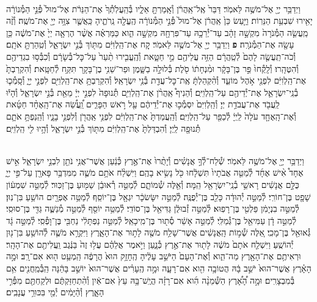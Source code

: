 \documentclass[twoside, openany, parskip=half, 11pt]{book}
\begin{document}
\begin{footnotesize}
\begin{multicols}{2}
\\
וַיְדַבֵּ֥ר יְיָ֖ אֶל־מֹשֶׁ֥ה לֵּאמֹֽר׃ דַּבֵּר֙ אֶֽל־אַֽהֲרֹ֔ן וְ֯אָֽמַרְתָּ֖ אֵלָ֑יו בְּ֯הַֽעֲלֹֽתְ֯ךָ֙ אֶת־הַנֵּרֹ֔ת אֶל־מוּל֙ פְּ֯נֵ֣י הַמְּ֯נוֹרָ֔ה יָאִ֖ירוּ שִׁבְעַ֥ת הַנֵּרֽוֹת׃ וַיַּ֤עַשׂ כֵּן֙ אַֽהֲרֹ֔ן אֶל־מוּל֙ פְּ֯נֵ֣י הַמְּ֯נוֹרָ֔ה הֶֽעֱלָ֖ה נֵֽרֹתֶ֑יהָ כַּֽאֲשֶׁ֛ר צִוָּ֥ה יְיָ֖ אֶת־מֹשֶֽׁה׃ וְ֯זֶ֨ה מַֽעֲשֵׂ֤ה הַמְּ֯נֹרָה֙ מִקְשָׁ֣ה זָהָ֔ב עַד־יְ֯רֵכָ֥הּ עַד־פִּרְחָ֖הּ מִקְשָׁ֣ה הִ֑וא כַּמַּרְאֶ֗ה אֲשֶׁ֨ר הֶרְאָ֤ה יְיָ֙ אֶת־מֹשֶׁ֔ה כֵּ֥ן עָשָׂ֖ה אֶת־הַמְּ֯נֹרָֽה׃ \textbf{פ}
וַיְדַבֵּ֥ר יְיָ֖ אֶל־מֹשֶׁ֥ה לֵּאמֹֽר׃ קַ֚ח אֶת־הַֽלְוִיִּ֔ם מִתּ֖וֹךְ בְּ֯נֵ֣י יִשְׂרָאֵ֑ל וְ֯טִֽהַרְתָּ֖ אֹתָֽם׃ וְ֯כֹה־תַֽעֲשֶׂ֤ה לָהֶם֙ לְ֯טַֽהֲרָ֔ם הַזֵּ֥ה עֲלֵיהֶ֖ם מֵ֣י חַטָּ֑את וְ֯הֶֽעֱבִ֤ירוּ תַ֨עַר֙ עַל־כׇּל־בְּ֯שָׂרָ֔ם וְ֯כִבְּ֯ס֥וּ בִגְדֵיהֶ֖ם וְ֯הִטֶּהָֽרוּ׃ וְ֯לָֽקְ֯חוּ֙ פַּ֣ר בֶּן־בָּקָ֔ר וּמִ֨נְחָת֔וֹ סֹ֖לֶת בְּ֯לוּלָ֣ה בַשָּׁ֑מֶן וּפַר־שֵׁנִ֥י בֶן־בָּקָ֖ר תִּקַּ֥ח לְ֯חַטָּֽאת׃ וְ֯הִקְרַבְתָּ֙ אֶת־הַֽלְוִיִּ֔ם לִפְנֵ֖י אֹ֣הֶל מוֹעֵ֑ד וְ֯הִ֨קְהַלְתָּ֔ אֶֽת־כׇּל־עֲדַ֖ת בְּ֯נֵ֥י יִשְׂרָאֵֽל׃  וְ֯הִקְרַבְתָּ֥ אֶת־הַֽלְוִיִּ֖ם לִפְנֵ֣י יְיָ֑ וְ֯סָֽמְ֯כ֧וּ בְ֯נֵֽי־יִשְׂרָאֵ֛ל אֶת־יְ֯דֵיהֶ֖ם עַל־הַֽלְוִיִּֽם׃ וְ֯הֵנִיף֩ אַֽהֲרֹ֨ן אֶת־הַֽלְוִיִּ֤ם תְּ֯נוּפָה֙ לִפְנֵ֣י יְיָ֔ מֵאֵ֖ת בְּ֯נֵ֣י יִשְׂרָאֵ֑ל וְ֯הָי֕וּ לַֽעֲבֹ֖ד אֶת־עֲבֹדַ֥ת יְיָ׃ וְ֯הַֽלְוִיִּם֙ יִסְמְ֯כ֣וּ אֶת־יְ֯דֵיהֶ֔ם עַ֖ל רֹ֣אשׁ הַפָּרִ֑ים וַֽ֠עֲשֵׂ֠ה אֶת־הָֽאֶחָ֨ד חַטָּ֜את וְ֯אֶת־הָֽאֶחָ֤ד עֹלָה֙ לַֽיְיָ֔ לְ֯כַפֵּ֖ר עַל־הַֽלְוִיִּֽם׃ וְ֯הַֽעֲמַדְתָּ֙ אֶת־הַֽלְוִיִּ֔ם לִפְנֵ֥י אַֽהֲרֹ֖ן וְ֯לִפְנֵ֣י בָנָ֑יו וְ֯הֵֽנַפְתָּ֥ אֹתָ֛ם תְּ֯נוּפָ֖ה לַֽיְיָ׃ וְ֯הִבְדַּלְתָּ֙ אֶת־הַֽלְוִיִּ֔ם מִתּ֖וֹךְ בְּ֯נֵ֣י יִשְׂרָאֵ֑ל וְ֯הָ֥יוּ לִ֖י הַֽלְוִיִּֽם׃

\\
וַיְדַבֵּ֥ר יְיָ֖ אֶל־מֹשֶׁ֥ה לֵּאמֹֽר׃ שְׁ֯לַח־לְ֯ךָ֣ אֲנָשִׁ֗ים וְ֯יָתֻ֨רוּ֙ אֶת־אֶ֣רֶץ כְּ֯נַ֔עַן אֲשֶׁר־אֲנִ֥י נֹתֵ֖ן לִבְנֵ֣י יִשְׂרָאֵ֑ל אִ֣ישׁ אֶחָד֩ אִ֨ישׁ אֶחָ֜ד לְ֯מַטֵּ֤ה אֲבֹתָיו֙ תִּשְׁלָ֔חוּ כֹּ֖ל נָשִׂ֥יא בָהֶֽם׃ וַיִּשְׁלַ֨ח אֹתָ֥ם מֹשֶׁ֛ה מִמִּדְבַּ֥ר פָּארָ֖ן עַל־פִּ֣י יְיָ֑ כֻּלָּ֣ם אֲנָשִׁ֔ים רָאשֵׁ֥י בְ֯נֵֽי־יִשְׂרָאֵ֖ל הֵֽמָּה׃  וְ֯אֵ֖לֶּה שְׁ֯מוֹתָ֑ם לְ֯מַטֵּ֣ה רְ֯אוּבֵ֔ן שַׁמּ֖וּעַ בֶּן־זַכּֽוּר׃ לְ֯מַטֵּ֣ה שִׁמְע֔וֹן שָׁפָ֖ט בֶּן־חוֹרִֽי׃ לְ֯מַטֵּ֣ה יְ֯הוּדָ֔ה כָּלֵ֖ב בֶּן־יְ֯פֻנֶּֽה׃ לְ֯מַטֵּ֣ה יִשָּׂשׂכָ֔ר יִגְאָ֖ל בֶּן־יוֹסֵֽף׃ לְ֯מַטֵּ֥ה אֶפְרָ֖יִם הוֹשֵׁ֥עַ בִּן־נֽוּן׃ לְ֯מַטֵּ֣ה בִנְיָמִ֔ן פַּלְטִ֖י בֶּן־רָפֽוּא׃ לְ֯מַטֵּ֣ה זְ֯בוּלֻ֔ן גַּדִּיאֵ֖ל בֶּן־סוֹדִֽי׃ לְ֯מַטֵּ֥ה יוֹסֵ֖ף לְ֯מַטֵּ֣ה מְ֯נַשֶּׁ֑ה גַּדִּ֖י בֶּן־סוּסִֽי׃ לְ֯מַטֵּ֣ה דָ֔ן עַמִּיאֵ֖ל בֶּן־גְּ֯מַלִּֽי׃ לְ֯מַטֵּ֣ה אָשֵׁ֔ר סְ֯ת֖וּר בֶּן־מִֽיכָאֵֽל׃ לְ֯מַטֵּ֣ה נַפְתָּלִ֔י נַחְבִּ֖י בֶּן־וָפְ֯סִֽי׃ לְ֯מַטֵּ֣ה גָ֔ד גְּ֯אוּאֵ֖ל בֶּן־מָכִֽי׃ אֵ֚לֶּה שְׁ֯מ֣וֹת הָֽאֲנָשִׁ֔ים אֲשֶׁר־שָׁלַ֥ח מֹשֶׁ֖ה לָת֣וּר אֶת־הָאָ֑רֶץ וַיִּקְרָ֥א מֹשֶׁ֛ה לְ֯הוֹשֵׁ֥עַ בִּן־נ֖וּן יְ֯הוֹשֻֽׁעַ׃  וַיִּשְׁלַ֤ח אֹתָם֙ מֹשֶׁ֔ה לָת֖וּר אֶת־אֶ֣רֶץ כְּ֯נָ֑עַן וַיֹּ֣אמֶר אֲלֵהֶ֗ם עֲל֥וּ זֶה֙ בַּנֶּ֔גֶב וַֽעֲלִיתֶ֖ם אֶת־הָהָֽר׃ וּרְאִיתֶ֥ם אֶת־הָאָ֖רֶץ מַה־הִ֑וא וְ֯אֶת־הָעָם֙ הַיֹּשֵׁ֣ב עָלֶ֔יהָ הֶֽחָזָ֥ק הוּא֙ הֲרָפֶ֔ה הַֽמְעַ֥ט ה֖וּא אִם־רָֽב׃ וּמָ֣ה הָאָ֗רֶץ אֲשֶׁר־הוּא֙ יֹשֵׁ֣ב בָּ֔הּ הֲטוֹבָ֥ה הִ֖וא אִם־רָעָ֑ה וּמָ֣ה הֶֽעָרִ֗ים אֲשֶׁר־הוּא֙ יוֹשֵׁ֣ב בָּהֵ֔נָּה הַֽבְּ֯מַֽחֲנִ֖ים אִ֥ם בְּ֯מִבְצָרִֽים׃ וּמָ֣ה הָ֠אָ֠רֶץ הַשְּׁ֯מֵנָ֨ה הִ֜וא אִם־רָזָ֗ה הֲיֶֽשׁ־בָּ֥הּ עֵץ֙ אִם־אַ֔יִן וְ֯הִ֨תְחַזַּקְתֶּ֔ם וּלְקַחְתֶּ֖ם מִפְּ֯רִ֣י הָאָ֑רֶץ וְ֯הַ֨יָּמִ֔ים יְ֯מֵ֖י בִּכּוּרֵ֥י עֲנָבִֽים׃


\end{multicols}
\end{footnotesize}
\end{document}
